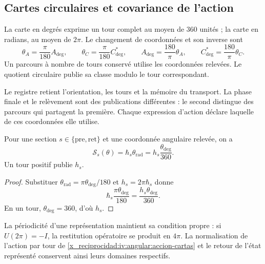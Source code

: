 \subsection{Cartes circulaires et covariance de l’action}
\label{x_reciprocidad:iv:angular:cartas}

\begin{definition}
\label{x_reciprocidad:iv:angular:unidades}
La carte en degrés exprime un tour complet au moyen de \(360\)
unités ; la carte en radians, au moyen de \(2\pi\). Le changement
de coordonnées et son inverse sont
\begin{equation}
 \theta_A=\frac{\pi}{180}A_{\deg},\qquad
 \theta_C=\frac{\pi}{180}C^*_{\deg},\qquad
 A_{\deg}=\frac{180}{\pi}\theta_A,\qquad
 C^*_{\deg}=\frac{180}{\pi}\theta_C.
 \label{x_reciprocidad:iv:angular:cambio-carta}
\end{equation}
Un parcours à nombre de tours conservé utilise les
coordonnées relevées. Le quotient circulaire publie sa
classe modulo le tour correspondant.
\end{definition}

Le registre retient l’orientation, les tours et la mémoire du transport.
La phase finale et le relèvement sont des publications différentes :
le second distingue des parcours qui partagent la première.
Chaque expression d’action déclare laquelle de ces coordonnées elle utilise.

\begin{proposition}
\label{x_reciprocidad:iv:angular:accion}
Pour une section \(s\in\{\mathrm{pre},\mathrm{ret}\}\) et une
coordonnée angulaire relevée, on a
\begin{equation}
 \mathcal S_s(\theta)
 =\hbar_s\theta_{\mathrm{rad}}
 =h_s\frac{\theta_{\deg}}{360}.
 \label{x_reciprocidad:iv:angular:accion-cartas}
\end{equation}
Un tour positif publie \(h_s\).
\end{proposition}
\begin{proof}
Substituer
\(\theta_{\mathrm{rad}}=\pi\theta_{\deg}/180\) et
\(h_s=2\pi\hbar_s\) donne
\[
 \hbar_s\frac{\pi\theta_{\deg}}{180}
 =\frac{h_s\theta_{\deg}}{360}.
\]
En un tour, \(\theta_{\deg}=360\), d’où \(h_s\).
\end{proof}

La périodicité d’une représentation maintient sa condition
propre : si \(U(2\pi)=-I\), la restitution opératoire se produit
en \(4\pi\). La normalisation de l’action par tour de
\eqref{x_reciprocidad:iv:angular:accion-cartas} et le retour de l’état
représenté conservent ainsi leurs domaines respectifs.

